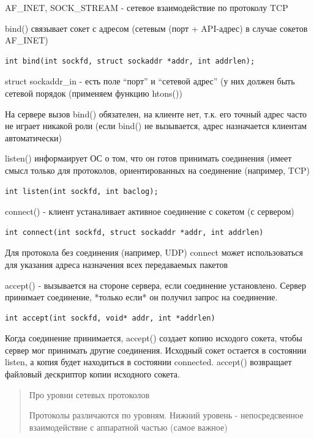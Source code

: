 AF\_INET, SOCK\_STREAM - сетевое взаимодействие по протоколу TCP

bind() связывает сокет с адресом (сетевым (порт + API-адрес) в случае сокетов AF\_INET)

\begin{lstlisting}
int bind(int sockfd, struct sockaddr *addr, int addrlen);
\end{lstlisting}

struct sockaddr\_in - есть поле “порт” и “сетевой адрес” (у них должен быть сетевой порядок (применяем функцию htons())

На сервере вызов bind() обязателен, на клиенте нет, т.к. его точный адрес часто не играет никакой роли (если bind() не вызывается, адрес назначается клиентам автоматически)

listen() информаирует ОС о том, что он готов принимать соединения (имеет смысл только для протоколов, ориентированных на соединение (например, TCP)

\begin{lstlisting}
int listen(int sockfd, int baclog);
\end{lstlisting}
connect() - клиент устаналивает активное соединение с сокетом (с сервером)
\begin{lstlisting}
int connect(int sockfd, struct sockaddr *addr, int addrlen)
\end{lstlisting}

Для протокола без соединения (например, UDP) connect может использоваться для указания адреса назначения всех передаваемых пакетов

accept() - вызывается на стороне сервера, если соединение установлено. Сервер принимает соединение, *только если* он получил запрос на соединение.

\begin{lstlisting}
int accept(int sockfd, void* addr, int *addrlen)
\end{lstlisting}

Когда соединение принимается, accept()  создает копию исходого сокета, чтобы сервер мог принимать другие соединения. Исходный сокет остается в состоянии listen, а копия будет находиться в состоянии connected. accept() возвращает файловый дескриптор копии исходного сокета.

\begin{quote}
Про уровни сетевых протоколов

Протоколы различаются по уровням. Нижний уровень - непосредсвенное взаимодействие с аппаратной частью (самое важное)
\end{quote}

